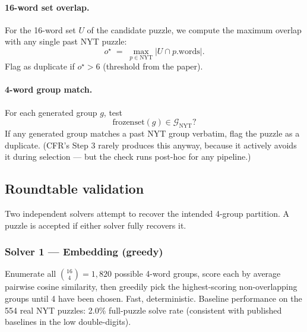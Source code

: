 \documentclass[11pt, letterpaper]{article}
\begin{document}
\paragraph{16-word set overlap.}
For the 16-word set $U$ of the candidate puzzle, we compute the maximum overlap
with any single past NYT puzzle:
\begin{equation}
o^\star \;=\; \max_{p \in \text{NYT}} |U \cap p.\text{words}|.
\end{equation}
Flag as duplicate if $o^\star > 6$ (threshold from the paper).

\paragraph{4-word group match.}
For each generated group $g$, test
\begin{equation}
\text{frozenset}(g) \in \mathcal{G}_\text{NYT}?
\end{equation}
If any generated group matches a past NYT group verbatim, flag the puzzle as a
duplicate. (CFR's Step 3 rarely produces this anyway, because it actively avoids it
during selection --- but the check runs post-hoc for any pipeline.)

\subsection{Roundtable validation}
\label{sec:roundtable}
Two independent solvers attempt to recover the intended 4-group partition. A
puzzle is accepted if either solver fully recovers it.

\subsubsection{Solver 1 --- Embedding (greedy)}
Enumerate all $\binom{16}{4} = 1{,}820$ possible 4-word groups, score each by
average pairwise cosine similarity, then greedily pick the highest-scoring
non-overlapping groups until 4 have been chosen. Fast, deterministic. Baseline
performance on the 554 real NYT puzzles: 2.0\% full-puzzle solve rate (consistent
with published baselines in the low double-digits).
\end{document}
